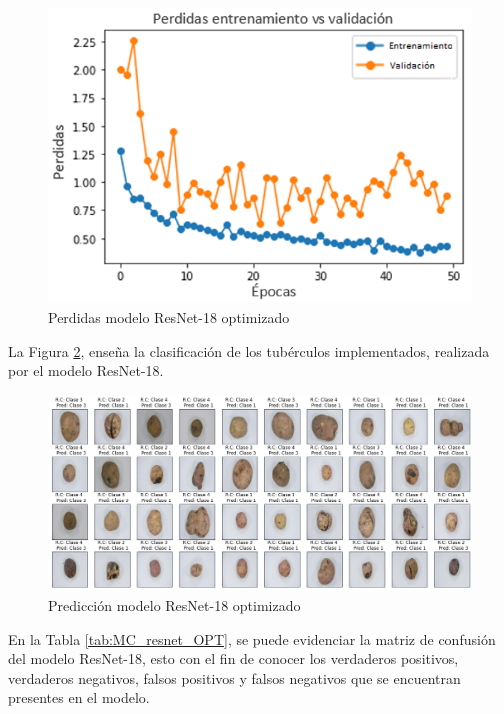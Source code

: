 \begin{figure}[ht]
	\centering
	\includegraphics[scale=0.6]{Figs/513.png}
	\caption{Perdidas modelo ResNet-18 optimizado}
	\label{fig:perdda_REs_opt}
\end{figure}

\newpage
La Figura \ref{fig:pre_res_opt}, enseña la clasificación de los tubérculos implementados, realizada por el modelo ResNet-18.

\begin{figure}[ht]
	\centering
	\includegraphics[scale=0.4]{Figs/514.png}
	\caption{Predicción modelo ResNet-18 optimizado}
	\label{fig:pre_res_opt}
\end{figure}

En la Tabla \ref{tab:MC_resnet_OPT}, se puede evidenciar la matriz de confusión del modelo ResNet-18, esto con el fin de conocer los verdaderos positivos, verdaderos negativos, falsos positivos y falsos negativos que se encuentran presentes en el modelo.

